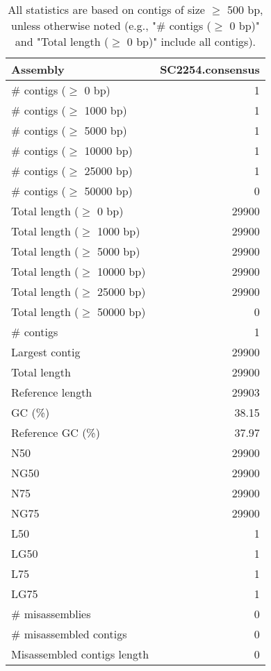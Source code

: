 \documentclass[12pt,a4paper]{article}
\begin{document}
\begin{table}[ht]
\begin{center}
\caption{All statistics are based on contigs of size $\geq$ 500 bp, unless otherwise noted (e.g., "\# contigs ($\geq$ 0 bp)" and "Total length ($\geq$ 0 bp)" include all contigs).}
\begin{tabular}{|l*{1}{|r}|}
\hline
Assembly & SC2254.consensus \\ \hline
\# contigs ($\geq$ 0 bp) & 1 \\ \hline
\# contigs ($\geq$ 1000 bp) & 1 \\ \hline
\# contigs ($\geq$ 5000 bp) & 1 \\ \hline
\# contigs ($\geq$ 10000 bp) & 1 \\ \hline
\# contigs ($\geq$ 25000 bp) & 1 \\ \hline
\# contigs ($\geq$ 50000 bp) & 0 \\ \hline
Total length ($\geq$ 0 bp) & 29900 \\ \hline
Total length ($\geq$ 1000 bp) & 29900 \\ \hline
Total length ($\geq$ 5000 bp) & 29900 \\ \hline
Total length ($\geq$ 10000 bp) & 29900 \\ \hline
Total length ($\geq$ 25000 bp) & 29900 \\ \hline
Total length ($\geq$ 50000 bp) & 0 \\ \hline
\# contigs & 1 \\ \hline
Largest contig & 29900 \\ \hline
Total length & 29900 \\ \hline
Reference length & 29903 \\ \hline
GC (\%) & 38.15 \\ \hline
Reference GC (\%) & 37.97 \\ \hline
N50 & 29900 \\ \hline
NG50 & 29900 \\ \hline
N75 & 29900 \\ \hline
NG75 & 29900 \\ \hline
L50 & 1 \\ \hline
LG50 & 1 \\ \hline
L75 & 1 \\ \hline
LG75 & 1 \\ \hline
\# misassemblies & 0 \\ \hline
\# misassembled contigs & 0 \\ \hline
Misassembled contigs length & 0 \\ \hline

\end{tabular}
\end{center}
\end{table}
\end{document}
